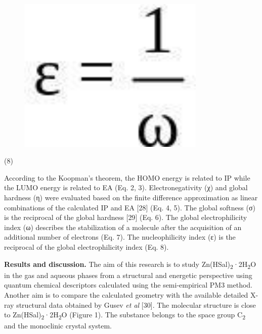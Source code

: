 \begin{figure}[H]
	\centering
	\includegraphics[width=0.8\textwidth]{assets/36}
	\caption*{}
\end{figure} (8)

According to the Koopman's theorem, the HOMO energy is related to IP
while the LUMO energy is related to EA (Eq. 2, 3). Electronegativity (χ)
and global hardness (η) were evaluated based on the finite difference
approximation as linear combinations of the calculated IP and EA
{[}28{]} (Eq. 4, 5). The global softness (σ) is the reciprocal of the
global hardness {[}29{]} (Eq. 6). The global electrophilicity index (ω)
describes the stabilization of a molecule after the acquisition of an
additional number of electrons (Eq. 7). The nucleophilicity index (ε) is
the reciprocal of the global electrophilicity index (Eq. 8).

{\bfseries Results and discussion.} The aim of this research is to study
Zn(HSal)\textsubscript{2}·2H\textsubscript{2}O in the gas and aqueous
phases from a structural and energetic perspective using quantum
chemical descriptors calculated using the semi-empirical PM3 method.
Another aim is to compare the calculated geometry with the available
detailed X-ray structural data obtained by Gusev \emph{et al} {[}30{]}.
The molecular structure is close to
Zn(HSal)\textsubscript{2}·2H\textsubscript{2}O (Figure 1). The substance
belongs to the space group C\textsubscript{2} and the monoclinic crystal
system.


